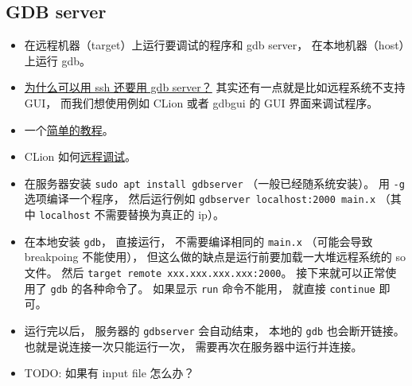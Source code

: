 \subsection{GDB server}
\begin{itemize}
\item 在远程机器（target）上运行要调试的程序和 gdb server， 在本地机器（host）上运行 gdb。
\item \href{https://stackoverflow.com/questions/69176457/the-difference-between-gdbserver-and-remote-gdb}{为什么可以用 ssh 还要用 gdb server？} 其实还有一点就是比如远程系统不支持 GUI， 而我们想使用例如 CLion 或者 gdbgui 的 GUI 界面来调试程序。
\item 一个\href{https://www.thegeekstuff.com/2014/04/gdbserver-example/}{简单的教程}。
\item CLion 如何\href{https://www.jetbrains.com/help/clion/remote-debug.html}{远程调试}。
\item 在服务器安装 \verb`sudo apt install gdbserver` （一般已经随系统安装）。 用 \verb`-g` 选项编译一个程序， 然后运行例如 \verb`gdbserver localhost:2000 main.x` （其中 \verb`localhost` 不需要替换为真正的 ip）。
\item 在本地安装 \verb`gdb`， 直接运行， 不需要编译相同的 \verb`main.x` （可能会导致 breakpoing 不能使用）， 但这么做的缺点是运行前要加载一大堆远程系统的 so 文件。 然后 \verb`target remote xxx.xxx.xxx.xxx:2000`。 接下来就可以正常使用了 \verb`gdb` 的各种命令了。 如果显示 \verb`run` 命令不能用， 就直接 \verb`continue` 即可。
\item 运行完以后， 服务器的 \verb`gdbserver` 会自动结束， 本地的 \verb`gdb` 也会断开链接。 也就是说连接一次只能运行一次， 需要再次在服务器中运行并连接。
\item TODO: 如果有 input file 怎么办？
\end{itemize}
